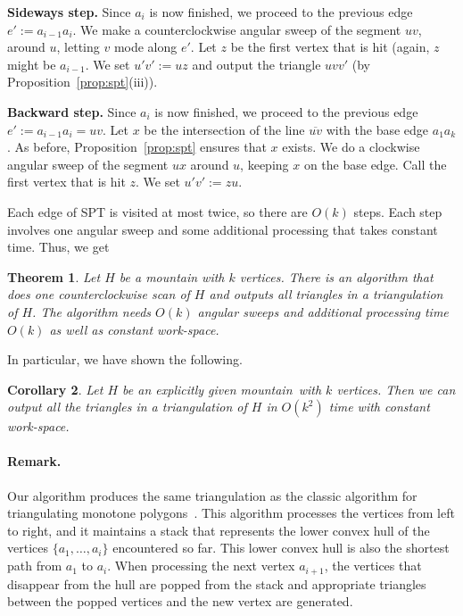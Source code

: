 \documentclass[11pt,a4paper]{article}
\newtheorem{theorem}{Theorem}[section]
\newtheorem{corol}[theorem]{Corollary}
\newcommand{\histogram}{mountain}
\newcommand{\eqdef}{:=}
\begin{document}
\textbf{Sideways step.}
Since $a_i$ is now finished, we
proceed to the previous edge $e' := a_{i-1}a_i$.
We make a counterclockwise angular sweep of the segment $uv$,
around $u$, letting $v$ mode along $e'$.
Let $z$ be the first vertex that is hit (again, $z$ might be $a_{i-1}$.
We set $u'v' \eqdef uz$ and output the
triangle  $uvv'$ (by Proposition~\ref{prop:spt}(iii)).

\textbf{Backward step.}
Since $a_i$ is now finished, we
proceed to the previous edge $e' := a_{i-1}a_i = uv$.
Let $x$ be the intersection of the line $\overline{uv}$
with the base edge $a_1a_k$. As before, Proposition~\ref{prop:spt}
ensures that $x$ exists.
We do a clockwise angular sweep of the segment $ux$ around
$u$, keeping $x$ on the base edge.
Call the first vertex that is hit $z$.
We set $u'v' \eqdef zu$.


Each edge of SPT is visited at most twice, so there are $O(k)$ steps.
Each step involves one angular sweep and some
additional processing that takes constant time. Thus, we get

\begin{theorem}
\label{thm:histo_triang}
Let $H$ be a \histogram{} with $k$ vertices. There is an algorithm
that does one counterclockwise scan of $H$
and outputs all triangles in a triangulation of $H$.
The algorithm needs $O(k)$ angular sweeps and
additional processing time $O(k)$ as well as constant work-space.
\end{theorem}
In particular, we have shown the following.
\begin{corol}
Let $H$ be an explicitly given \histogram{}\ with $k$ vertices.
Then we can output all the triangles in a triangulation of $H$
in $O(k^2)$ time with constant work-space.
\end{corol}

\paragraph{Remark.}
Our algorithm produces the same triangulation as the classic
algorithm for triangulating monotone polygons~\cite{GareyJoPrTa78}.
This algorithm processes the
vertices from left to right, and it
maintains a stack that represents
the lower convex hull of the vertices $\{a_1,\ldots,a_i\}$ encountered
so far.
This lower convex hull is also the shortest path from $a_1$ to $a_i$.
 When processing the next vertex $a_{i+1}$,
 the vertices that disappear from the hull are popped from the stack
 and appropriate triangles between the popped vertices and
 the new vertex are generated.
\end{document}
